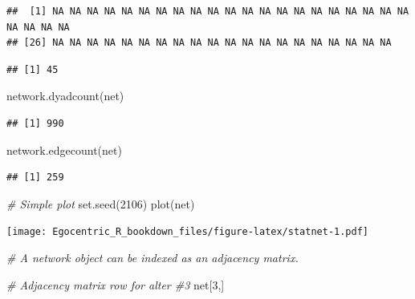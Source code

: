 \documentclass[
]{book}
\newenvironment{Shaded}{\begin{snugshade}}{\end{snugshade}}
\newcommand{\CommentTok}[1]{\textcolor[rgb]{0.56,0.35,0.01}{\textit{#1}}}
\newcommand{\DecValTok}[1]{\textcolor[rgb]{0.00,0.00,0.81}{#1}}
\newcommand{\FunctionTok}[1]{\textcolor[rgb]{0.00,0.00,0.00}{#1}}
\newcommand{\NormalTok}[1]{#1}
\newcommand{\OtherTok}[1]{\textcolor[rgb]{0.56,0.35,0.01}{#1}}
\newcommand{\SpecialCharTok}[1]{\textcolor[rgb]{0.00,0.00,0.00}{#1}}
\newcommand{\StringTok}[1]{\textcolor[rgb]{0.31,0.60,0.02}{#1}}
\begin{document}
\begin{verbatim}
##  [1] NA NA NA NA NA NA NA NA NA NA NA NA NA NA NA NA NA NA NA NA NA NA NA NA NA
## [26] NA NA NA NA NA NA NA NA NA NA NA NA NA NA NA NA NA NA NA NA
\end{verbatim}

\begin{Shaded}
\end{Shaded}

\begin{verbatim}
## [1] 45
\end{verbatim}

\begin{Shaded}
\begin{Highlighting}[]
\FunctionTok{network.dyadcount}\NormalTok{(net)}
\end{Highlighting}
\end{Shaded}

\begin{verbatim}
## [1] 990
\end{verbatim}

\begin{Shaded}
\begin{Highlighting}[]
\FunctionTok{network.edgecount}\NormalTok{(net)}
\end{Highlighting}
\end{Shaded}

\begin{verbatim}
## [1] 259
\end{verbatim}

\begin{Shaded}
\begin{Highlighting}[]
\CommentTok{\# Simple plot}
\FunctionTok{set.seed}\NormalTok{(}\DecValTok{2106}\NormalTok{)}
\FunctionTok{plot}\NormalTok{(net)}
\end{Highlighting}
\end{Shaded}

\texttt{[image: Egocentric\_R\_bookdown\_files/figure-latex/statnet-1.pdf]}

\begin{Shaded}
\begin{Highlighting}[]
\CommentTok{\# A network object can be indexed as an adjacency matrix.}

\CommentTok{\# Adjacency matrix row for alter \#3}
\NormalTok{net[}\DecValTok{3}\NormalTok{,]}
\end{Highlighting}
\end{Shaded}
\end{document}
